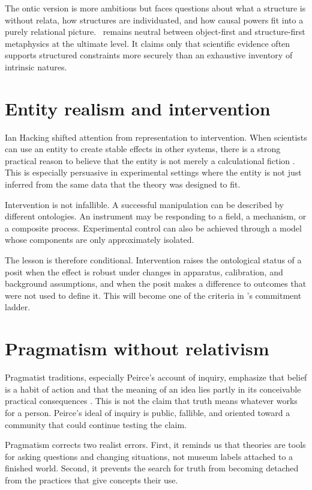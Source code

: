 The ontic version is more ambitious but faces questions about what a structure
is without relata, how structures are individuated, and how causal powers fit
into a purely relational picture. \RCR\ remains neutral between object-first
and structure-first metaphysics at the ultimate level. It claims only that
scientific evidence often supports structured constraints more securely than
an exhaustive inventory of intrinsic natures.

\section{Entity realism and intervention}

Ian Hacking shifted attention from representation to intervention. When
scientists can use an entity to create stable effects in other systems, there
is a strong practical reason to believe that the entity is not merely a
calculational fiction \citep{hacking1983}. This is especially persuasive in
experimental settings where the entity is not just inferred from the same data
that the theory was designed to fit.

Intervention is not infallible. A successful manipulation can be described by
different ontologies. An instrument may be responding to a field, a mechanism,
or a composite process. Experimental control can also be achieved through a
model whose components are only approximately isolated.

The lesson is therefore conditional. Intervention raises the ontological
status of a posit when the effect is robust under changes in apparatus,
calibration, and background assumptions, and when the posit makes a difference
to outcomes that were not used to define it. This will become one of the
criteria in \RCR's commitment ladder.

\section{Pragmatism without relativism}

Pragmatist traditions, especially Peirce's account of inquiry, emphasize that
belief is a habit of action and that the meaning of an idea lies partly in its
conceivable practical consequences \citep{peirce1878}. This is not the claim
that truth means whatever works for a person. Peirce's ideal of inquiry is
public, fallible, and oriented toward a community that could continue testing
the claim.

Pragmatism corrects two realist errors. First, it reminds us that theories are
tools for asking questions and changing situations, not museum labels attached
to a finished world. Second, it prevents the search for truth from becoming
detached from the practices that give concepts their use.

